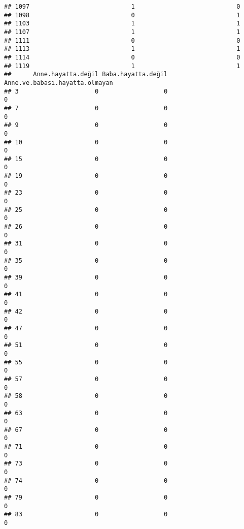 \documentclass[
]{article}
\begin{document}
\begin{verbatim}
## 1097                            1                            0
## 1098                            0                            1
## 1103                            1                            1
## 1107                            1                            1
## 1111                            0                            0
## 1113                            1                            1
## 1114                            0                            0
## 1119                            1                            1
##      Anne.hayatta.değil Baba.hayatta.değil Anne.ve.babası.hayatta.olmayan
## 3                     0                  0                              0
## 7                     0                  0                              0
## 9                     0                  0                              0
## 10                    0                  0                              0
## 15                    0                  0                              0
## 19                    0                  0                              0
## 23                    0                  0                              0
## 25                    0                  0                              0
## 26                    0                  0                              0
## 31                    0                  0                              0
## 35                    0                  0                              0
## 39                    0                  0                              0
## 41                    0                  0                              0
## 42                    0                  0                              0
## 47                    0                  0                              0
## 51                    0                  0                              0
## 55                    0                  0                              0
## 57                    0                  0                              0
## 58                    0                  0                              0
## 63                    0                  0                              0
## 67                    0                  0                              0
## 71                    0                  0                              0
## 73                    0                  0                              0
## 74                    0                  0                              0
## 79                    0                  0                              0
## 83                    0                  0                              0

\end{verbatim}
\end{document}
